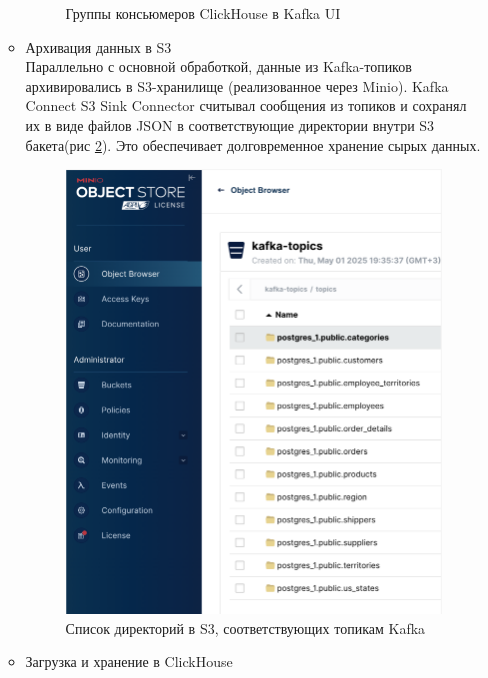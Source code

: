 \begin{enumerate}[1.]
\begin{itemize}
\begin{figure}[h]
                  \caption{Группы консьюмеров ClickHouse в Kafka UI}
                  \label{fig:ex1_kafka_ch_consumer}
                \end{figure}
                \FloatBarrier
          \item Архивация данных в S3\\
                Параллельно с основной обработкой, данные из Kafka-топиков архивировались
                в S3-хранилище (реализованное через Minio). Kafka Connect S3 Sink Connector считывал сообщения
                из топиков и сохранял их в виде файлов JSON в соответствующие директории внутри S3 бакета(рис \ref{fig:ex1_s3}). Это обеспечивает долговременное хранение сырых данных.
                \begin{figure}[h]
                  \center
                  \includegraphics [scale=0.45] {my_folder/images/ex1_s3}
                  \caption{ Список директорий в S3, соответствующих топикам Kafka}
                  \label{fig:ex1_s3}
                \end{figure}
                \FloatBarrier
          \item Загрузка и хранение в ClickHouse\\

\end{itemize}
\end{enumerate}
